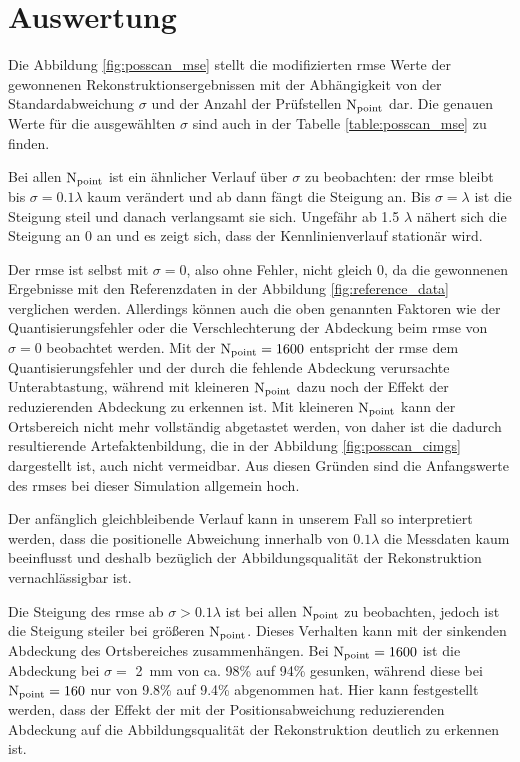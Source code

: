 \section{Auswertung} \label{sec:posscan_evaluation}
Die Abbildung \ref{fig:posscan_mse} stellt die modifizierten \acrshort{rmse} Werte der gewonnenen Rekonstruktionsergebnissen mit der Abhängigkeit von der Standardabweichung $\sigma$ und der Anzahl der Prüfstellen $\operatorname{N}_{\operatorname{point}}$ dar. Die genauen Werte für die ausgewählten $\sigma$ sind auch in der Tabelle  \ref{table:posscan_mse} zu finden. \par
Bei allen $\operatorname{N}_{\operatorname{point}}$ ist ein ähnlicher Verlauf über $\sigma$ zu beobachten: der \acrshort{rmse} bleibt bis $\sigma = 0.1 \lambda$ kaum verändert und ab dann fängt die Steigung an. Bis $\sigma = \lambda$ ist die Steigung steil und danach verlangsamt sie sich. Ungefähr ab 1.5 $\lambda$ nähert sich die Steigung an 0 an und es zeigt sich, dass der Kennlinienverlauf stationär wird.\par
Der \acrshort{rmse} ist selbst mit $\sigma = 0$, also ohne Fehler, nicht gleich 0, da die gewonnenen Ergebnisse mit den Referenzdaten in der Abbildung \ref{fig:reference_data} verglichen werden. Allerdings können auch die oben genannten Faktoren wie der Quantisierungsfehler oder die Verschlechterung der Abdeckung beim \acrshort{rmse} von $\sigma = 0$ beobachtet werden. Mit der $\operatorname{N}_{\operatorname{point}} = 1600$ entspricht der \acrshort{rmse} dem Quantisierungsfehler und der durch die fehlende Abdeckung verursachte Unterabtastung, während mit kleineren $\operatorname{N}_{\operatorname{point}}$ dazu noch der Effekt der reduzierenden Abdeckung zu erkennen ist. Mit kleineren $\operatorname{N}_{\operatorname{point}}$ kann der Ortsbereich nicht mehr vollständig abgetastet werden, von daher ist die dadurch resultierende Artefaktenbildung, die in der Abbildung \ref{fig:posscan_cimgs} dargestellt ist, auch nicht vermeidbar. Aus diesen Gründen sind die Anfangswerte des \acrshort{rmse}s bei dieser Simulation allgemein hoch. \par  
Der anfänglich gleichbleibende Verlauf kann in unserem Fall so interpretiert werden, dass die positionelle Abweichung innerhalb von $0.1 \lambda$ die Messdaten kaum beeinflusst und deshalb bezüglich der Abbildungsqualität der Rekonstruktion vernachlässigbar ist. \par 
Die Steigung des \acrshort{rmse} ab $\sigma > 0.1 \lambda$ ist bei allen $\operatorname{N}_{\operatorname{point}}$ zu beobachten, jedoch ist die Steigung steiler bei größeren $\operatorname{N}_{\operatorname{point}}$. Dieses Verhalten kann mit der sinkenden Abdeckung des Ortsbereiches zusammenhängen. Bei $\operatorname{N}_{\operatorname{point}} = 1600$ ist die Abdeckung bei $\sigma =$ \SI{2}{\milli\metre} von ca. 98\% auf 94\% gesunken, während diese bei $\operatorname{N}_{\operatorname{point}} = 160$ nur von 9.8\% auf 9.4\% abgenommen hat. Hier kann festgestellt werden, dass der Effekt der mit der Positionsabweichung reduzierenden Abdeckung auf die Abbildungsqualität der Rekonstruktion deutlich zu erkennen ist. \par
